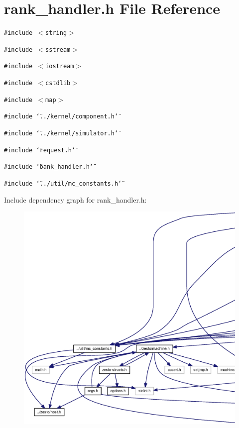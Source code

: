 \section{rank\_\-handler.h File Reference}
\label{rank__handler_8h}
{\tt \#include $<$string$>$}\par
{\tt \#include $<$sstream$>$}\par
{\tt \#include $<$iostream$>$}\par
{\tt \#include $<$cstdlib$>$}\par
{\tt \#include $<$map$>$}\par
{\tt \#include \char`\"{}../kernel/component.h\char`\"{}}\par
{\tt \#include \char`\"{}../kernel/simulator.h\char`\"{}}\par
{\tt \#include \char`\"{}request.h\char`\"{}}\par
{\tt \#include \char`\"{}bank\_\-handler.h\char`\"{}}\par
{\tt \#include \char`\"{}../util/mc\_\-constants.h\char`\"{}}\par


Include dependency graph for rank\_\-handler.h:\nopagebreak
\begin{figure}[H]
\begin{center}
\leavevmode
\includegraphics[width=420pt]{rank__handler_8h__incl}
\end{center}
\end{figure}


